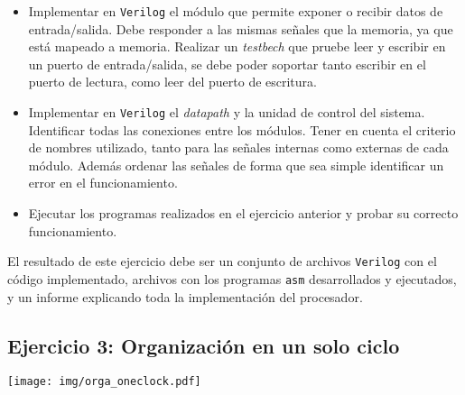 \documentclass[a4paper,11pt]{article}
\begin{document}
\begin{itemize}
 \item Implementar en \texttt{Verilog} el módulo que permite exponer o recibir datos de entrada/salida. Debe responder a las mismas señales que la memoria, ya que está mapeado a memoria. Realizar un \emph{testbech} que pruebe leer y escribir en un puerto de entrada/salida, se debe poder soportar tanto escribir en el puerto de lectura, como leer del puerto de escritura.
 
 \item Implementar en \texttt{Verilog} el \emph{datapath} y la unidad de control del sistema. Identificar todas las conexiones entre los módulos. Tener en cuenta el criterio de nombres utilizado, tanto para las señales internas como externas de cada módulo. Además ordenar las señales de forma que sea simple identificar un error en el funcionamiento.
 
 \item Ejecutar los programas realizados en el ejercicio anterior y probar su correcto funcionamiento.  
\end{itemize}

El resultado de este ejercicio debe ser un conjunto de archivos \texttt{Verilog} con el código implementado, archivos con los programas \texttt{asm} desarrollados y ejecutados, y un informe explicando toda la implementación del procesador.

\subsection{Ejercicio 3: Organización en un solo ciclo}

\begin{center}
\texttt{[image: img/orga\_oneclock.pdf]}
\end{center}
\end{document}
